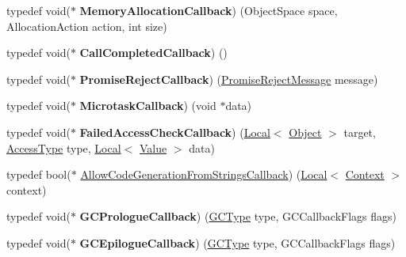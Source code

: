\begin{DoxyCompactItemize}
\item 
\hypertarget{namespacev8_a2402a6535cafc5f721192b300502fb0a}{}typedef void($\ast$ {\bfseries Memory\+Allocation\+Callback}) (Object\+Space space, Allocation\+Action action, int size)\label{namespacev8_a2402a6535cafc5f721192b300502fb0a}

\item 
\hypertarget{namespacev8_a8d88696ff21bd777d488605cb7714573}{}typedef void($\ast$ {\bfseries Call\+Completed\+Callback}) ()\label{namespacev8_a8d88696ff21bd777d488605cb7714573}

\item 
\hypertarget{namespacev8_a3367f6ae375d6d4b4b3f992953c135ba}{}typedef void($\ast$ {\bfseries Promise\+Reject\+Callback}) (\hyperlink{classv8_1_1PromiseRejectMessage}{Promise\+Reject\+Message} message)\label{namespacev8_a3367f6ae375d6d4b4b3f992953c135ba}

\item 
\hypertarget{namespacev8_a64445c32058729cdc44d56ff13458bed}{}typedef void($\ast$ {\bfseries Microtask\+Callback}) (void $\ast$data)\label{namespacev8_a64445c32058729cdc44d56ff13458bed}

\item 
\hypertarget{namespacev8_a1352a0d6e487b7092ea79e2d3d4ecd12}{}typedef void($\ast$ {\bfseries Failed\+Access\+Check\+Callback}) (\hyperlink{classv8_1_1Local}{Local}$<$ \hyperlink{classv8_1_1Object}{Object} $>$ target, \hyperlink{namespacev8_add8bef6469c5b94706584124e610046c}{Access\+Type} type, \hyperlink{classv8_1_1Local}{Local}$<$ \hyperlink{classv8_1_1Value}{Value} $>$ data)\label{namespacev8_a1352a0d6e487b7092ea79e2d3d4ecd12}

\item 
typedef bool($\ast$ \hyperlink{namespacev8_a521d909ec201742a1cb35d50a8e2a3c2}{Allow\+Code\+Generation\+From\+Strings\+Callback}) (\hyperlink{classv8_1_1Local}{Local}$<$ \hyperlink{classv8_1_1Context}{Context} $>$ context)
\item 
\hypertarget{namespacev8_a09e509ff7a94ad074420980c5f5762af}{}typedef void($\ast$ {\bfseries G\+C\+Prologue\+Callback}) (\hyperlink{namespacev8_ac109d6f27e0c0f9ef4e98bcf7a806cf2}{G\+C\+Type} type, G\+C\+Callback\+Flags flags)\label{namespacev8_a09e509ff7a94ad074420980c5f5762af}

\item 
\hypertarget{namespacev8_a4a818ae1aee0cb378a4c2037dfc4a4c2}{}typedef void($\ast$ {\bfseries G\+C\+Epilogue\+Callback}) (\hyperlink{namespacev8_ac109d6f27e0c0f9ef4e98bcf7a806cf2}{G\+C\+Type} type, G\+C\+Callback\+Flags flags)\label{namespacev8_a4a818ae1aee0cb378a4c2037dfc4a4c2}


\end{DoxyCompactItemize}
